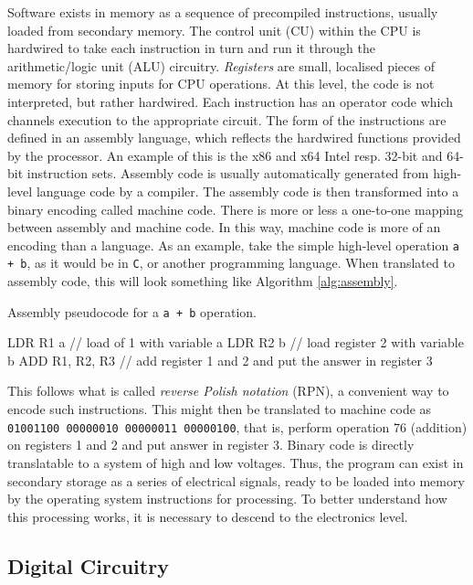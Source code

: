 \documentclass[11pt]{amsart}
\begin{document}
Software exists in memory as a sequence of precompiled instructions, usually loaded from secondary memory. The control unit (CU) within the CPU is hardwired to take each instruction in turn and run it through the arithmetic/logic unit (ALU) circuitry. \emph{Registers} are small, localised pieces of memory for storing inputs for CPU operations. At this level, the code is not interpreted, but rather hardwired. Each instruction has an operator code which channels execution to the appropriate circuit. The form of the instructions are defined in an assembly language, which reflects the hardwired functions provided by the processor. An example of this is the x86 and x64 Intel resp. 32-bit and 64-bit instruction sets. Assembly code is usually automatically generated from high-level language code by a compiler. The assembly code is then transformed into a binary encoding called machine code. There is more or less a one-to-one mapping between assembly and machine code. In this way, machine code is more of an encoding than a language. As an example, take the simple high-level operation \texttt{a + b}, as it would be in \texttt{C}, or another programming language. When translated to assembly code, this will look something like Algorithm \ref{alg:assembly}.

\begin{algorithm}
\caption{Assembly pseudocode for a \texttt{a + b} operation.}\label{alg:assembly}
\begin{algorithmic}[1]
\State LDR R1 a // load of 1 with variable a
\State LDR R2 b // load register 2 with variable b
\State ADD R1, R2, R3 // add register 1 and 2 and put the answer in register 3
\end{algorithmic}
\end{algorithm}

This follows what is called \emph{reverse Polish notation} (RPN), a convenient way to encode such instructions. This might then be translated to machine code as \texttt{01001100 00000010 00000011 00000100}, that is, perform operation 76 (addition) on registers 1 and 2 and put answer in register 3. Binary code is directly translatable to a system of high and low voltages. Thus, the program can exist in secondary storage as a series of electrical signals, ready to be loaded into memory by the operating system instructions for processing. To better understand how this processing works, it is necessary to descend to the electronics level.

\subsection{Digital Circuitry}
\end{document}
